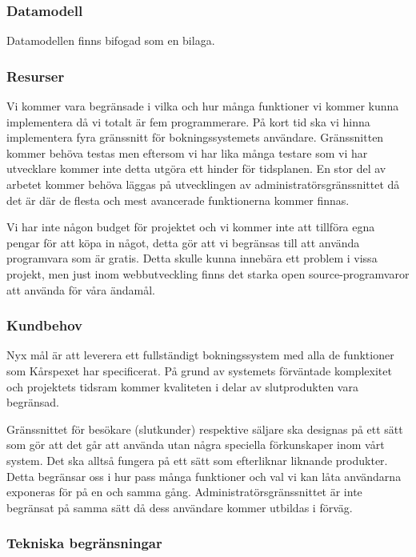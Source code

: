 \documentclass[a4paper, twoside, 11pt, titlepage]{article}
\begin{document}
		\subsubsection{Datamodell}


		Datamodellen finns bifogad som en bilaga.

		\subsubsection{Resurser}


		Vi kommer vara begränsade i vilka och hur många funktioner vi kommer kunna implementera då vi totalt är fem programmerare. På kort tid ska vi hinna implementera fyra gränssnitt för bokningssystemets användare. Gränssnitten kommer behöva testas men eftersom vi har lika många testare som vi har utvecklare kommer inte detta utgöra ett hinder för tidsplanen. En stor del av arbetet kommer behöva läggas på utvecklingen av administratörsgränssnittet då det är där de flesta och mest avancerade funktionerna kommer finnas.

		Vi har inte någon budget för projektet och vi kommer inte att tillföra egna pengar för att köpa in något, detta gör att vi begränsas till att använda programvara som är gratis. Detta skulle kunna innebära ett problem i vissa projekt, men just inom webbutveckling finns det starka open source-programvaror att använda för våra ändamål.

		\subsubsection{Kundbehov}


		Nyx mål är att leverera ett fullständigt bokningssystem med alla de funktioner som Kårspexet har specificerat. På grund av systemets förväntade komplexitet och projektets tidsram kommer kvaliteten i delar av slutprodukten vara begränsad.

		Gränssnittet för besökare (slutkunder) respektive säljare ska designas på ett sätt som gör att det går att använda utan några speciella förkunskaper inom vårt system. Det ska alltså fungera på ett sätt som efterliknar liknande produkter. Detta begränsar oss i hur pass många funktioner och val vi kan låta användarna exponeras för på en och samma gång. Administratörsgränssnittet är inte begränsat på samma sätt då dess användare kommer utbildas i förväg.

		\subsubsection{Tekniska begränsningar}
\end{document}
